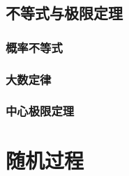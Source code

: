 \documentclass[zihao=-4,linespread=1.5,a4paper,heading=true,oneside]{ctexbook}
\theoremstyle{definition}
\begin{document}
\chapter{不等式与极限定理}\label{chap:5}
\section{概率不等式}\label{sec:5.1}

\section{大数定律}\label{sec:5.2}

\section{中心极限定理}\label{sec:5.3}


\part{随机过程}\label{part:2}

\end{document}
